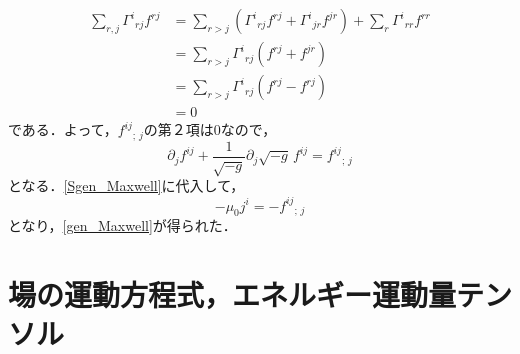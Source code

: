 \documentclass[a4paper]{ltjsreport}
\begin{document}
\begin{align*}
  \sum_{r,j}{\Gamma^i}_{rj}f^{rj} &= \sum_{r>j}\left({\Gamma^i}_{rj}f^{rj} + {\Gamma^i}_{jr}f^{jr}\right) + \sum_{r}{\Gamma^i}_{rr}f^{rr}\\
  &= \sum_{r>j}{\Gamma^i}_{rj}\left(f^{rj} + f^{jr}\right)\\
  &= \sum_{r>j}{\Gamma^i}_{rj}\left(f^{rj} - f^{rj}\right)\\
  &= 0
\end{align*}
である．よって，${f^{ij}}_{;\,j}$の第２項は$0$なので，
\[\partial_jf^{ij} + \dfrac{1}{\sqrt{ - g}}\partial_j\sqrt{ - g}\,f^{ij}={f^{ij}}_{;\,j}\]
となる．\eqref{Sgen_Maxwell}に代入して，
\[  - \mu_0j^i =  - {f^{ij}}_{;\,j} \]
となり，\eqref{gen_Maxwell}が得られた．

\section{場の運動方程式，エネルギー運動量テンソル}
\end{document}
